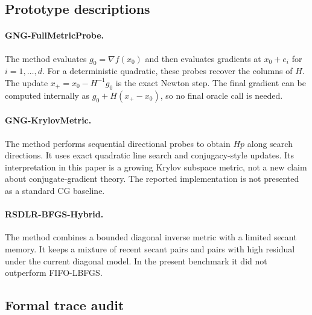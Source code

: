 \subsection{Prototype descriptions}

\paragraph{GNG-FullMetricProbe.}
The method evaluates $g_0=\nabla f(x_0)$ and then evaluates gradients at
$x_0+e_i$ for $i=1,\ldots,d$.  For a deterministic quadratic, these probes
recover the columns of $H$.  The update $x_+=x_0-H^{-1}g_0$ is the exact
Newton step.  The final gradient can be computed internally as
$g_0+H(x_+-x_0)$, so no final oracle call is needed.

\paragraph{GNG-KrylovMetric.}
The method performs sequential directional probes to obtain $Hp$ along
search directions.  It uses exact quadratic line search and conjugacy-style
updates.  Its interpretation in this paper is a growing Krylov subspace
metric, not a new claim about conjugate-gradient theory.
The reported implementation is not presented as a standard CG baseline.

\paragraph{RSDLR-BFGS-Hybrid.}
The method combines a bounded diagonal inverse metric with a limited secant
memory.  It keeps a mixture of recent secant pairs and pairs with high
residual under the current diagonal model.  In the present benchmark it did
not outperform FIFO-LBFGS.

\subsection{Formal trace audit}

